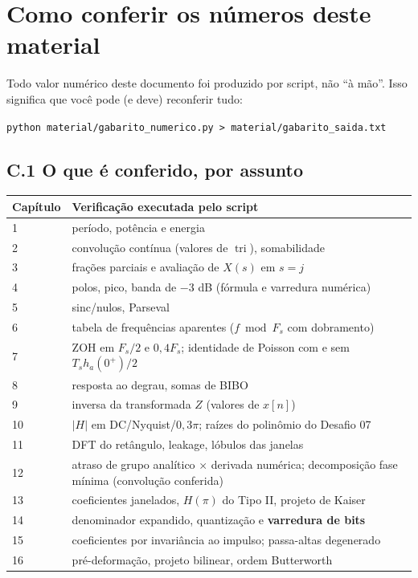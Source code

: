 \section{Como conferir os números deste material}\label{ap:verif}

Todo valor numérico deste documento foi produzido por script, não ``à mão''.
Isso significa que você pode (e deve) reconferir tudo:

\begin{center}
\texttt{python material/gabarito\_numerico.py > material/gabarito\_saida.txt}
\end{center}

\subsection*{C.1 O que é conferido, por assunto}

\begin{center}
\small
\begin{tabular}{p{1.5cm}p{8.4cm}}
\toprule
Capítulo & Verificação executada pelo script\\ \midrule
1 & período, potência e energia\\
2 & convolução contínua (valores de $\operatorname{tri}$), somabilidade\\
3 & frações parciais e avaliação de $X(s)$ em $s=j$\\
4 & polos, pico, banda de $-3$ dB (fórmula e varredura numérica)\\
5 & sinc/nulos, Parseval\\
6 & tabela de frequências aparentes ($f\bmod F_s$ com dobramento)\\
7 & ZOH em $F_s/2$ e $0{,}4F_s$; identidade de Poisson com e sem
    $T_sh_a(0^+)/2$\\
8 & resposta ao degrau, somas de BIBO\\
9 & inversa da transformada $Z$ (valores de $x[n]$)\\
10 & $|H|$ em DC/Nyquist/$0{,}3\pi$; raízes do polinômio do Desafio 07\\
11 & DFT do retângulo, leakage, lóbulos das janelas\\
12 & atraso de grupo analítico $\times$ derivada numérica; decomposição
    fase mínima (convolução conferida)\\
13 & coeficientes janelados, $H(\pi)$ do Tipo II, projeto de Kaiser\\
14 & denominador expandido, quantização e \textbf{varredura de bits}\\
15 & coeficientes por invariância ao impulso; passa-altas degenerado\\
16 & pré-deformação, projeto bilinear, ordem Butterworth\\
\bottomrule
\end{tabular}
\end{center}

